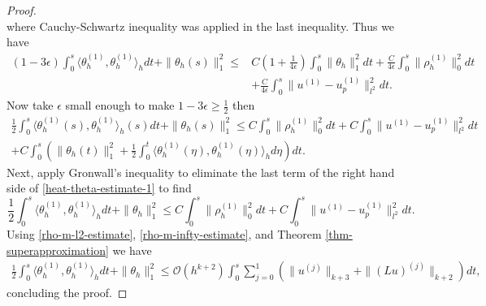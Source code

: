 \documentclass[onefignum,onetabnum]{siamart171218}
\begin{document}
\begin{proof}
\begin{equation*}
\end{equation*}
where Cauchy-Schwartz inequality  was  applied in the last inequality.
Thus we have
\begin{equation*}
\begin{aligned}
 (1-3\epsilon)\int_0^s\langle \theta_h^{(1)}, \theta_h^{(1)} \rangle_hdt +\|\theta_h(s)\|^2_{1} \leq & C(1+\frac{1}{4\epsilon}) \int_0^s  \|\theta_h\|^2_{1}dt +  \frac{C}{4\epsilon}\int_0^s \|\rho_h^{(1)}\|^2_{0}dt \\
&  + \frac{C}{4\epsilon}\int_0^s \| u^{(1)}-u^{(1)}_p\|^2_{l^2}dt.
\end{aligned}
\end{equation*}
 Now take  $\epsilon$ small enough to make $1-3\epsilon\geq \frac12$ then 
\begin{equation}\label{heat-theta-estimate-1} 
\begin{aligned}
 \frac12 \int_0^s\langle \theta_h^{(1)}(s), \theta_h^{(1)} \rangle_h(s)dt +\|\theta_h(s)\|^2_{1} \leq  C\int_0^s \|\rho_h^{(1)}\|^2_{0}dt + C\int_0^s \| u^{(1)}-u^{(1)}_p\|^2_{l^2}dt\\
+ C\int_0^s \left( \|\theta_h(t)\|^2_{1}+ \frac12 \int_0^t\langle \theta_h^{(1)}(\eta), \theta_h^{(1)}(\eta) \rangle_h d\eta\right)dt. 
\end{aligned}
\end{equation}
 Next, apply  Gronwall's inequality to eliminate the last term of the right hand side of \eqref{heat-theta-estimate-1}  to find 
\begin{equation*}
\frac12\int_0^s\langle \theta_h^{(1)}, \theta_h^{(1)} \rangle_hdt + \|\theta_h\|^2_{1} \leq C \int_0^s \|\rho_h^{(1)}\|^2_{0}dt + C\int_0^s \| u^{(1)}-u^{(1)}_p\|^2_{l^2}dt.
\end{equation*}
 Using \eqref{rho-m-l2-estimate},  \eqref{rho-m-infty-estimate}, and Theorem \ref{thm-superapproximation} we have 
\begin{align*}
\frac12\int_0^s\langle \theta_h^{(1)}, \theta_h^{(1)} \rangle_hdt + \|\theta_h\|^2_{1} \leq \mathcal O(h^{k+2}) \int_0^s \sum_{j=0}^1(\|u^{(j)}\|_{k+3}+\|(Lu)^{(j)}\|_{k+2}) dt,
\end{align*}
 concluding the proof.
\end{proof}
\end{document}
